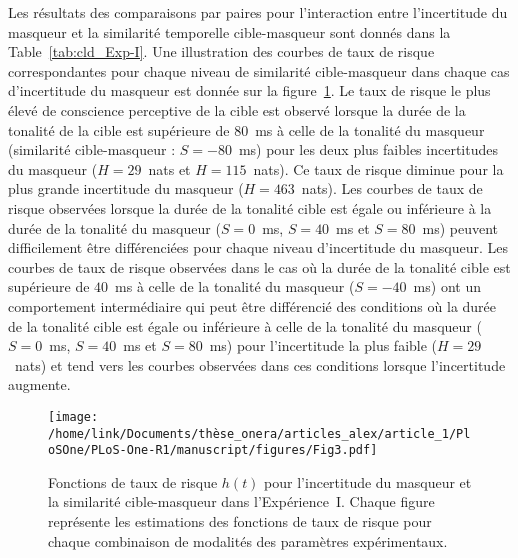 Les résultats des comparaisons par paires pour l'interaction entre l'incertitude du masqueur et la similarité temporelle cible-masqueur sont donnés dans la Table~\ref{tab:cld_Exp-I}. 
Une illustration des courbes de taux de risque correspondantes pour chaque niveau de similarité cible-masqueur dans chaque cas d'incertitude du masqueur est donnée sur la figure~\ref{fig:hr_Exp-I}.
Le taux de risque le plus élevé de conscience perceptive de la cible est observé lorsque la durée de la tonalité de la cible est supérieure de $80$~ms à celle de la tonalité du masqueur (similarité cible-masqueur : $S=-80$~ms) pour les deux plus faibles incertitudes du masqueur ($H=29$~nats et $H=115$~nats). 
Ce taux de risque diminue pour la plus grande incertitude du masqueur ($H=463$~nats). 
Les courbes de taux de risque observées lorsque la durée de la tonalité cible est égale ou inférieure à la durée de la tonalité du masqueur ($S=0$~ms, $S=40$~ms et $S=80$~ms) peuvent difficilement être différenciées pour chaque niveau d'incertitude du masqueur. 
Les courbes de taux de risque observées dans le cas où la durée de la tonalité cible est supérieure de $40$~ms à celle de la tonalité du masqueur ($S=-40$~ms) ont un comportement intermédiaire qui peut être différencié des conditions où la durée de la tonalité cible est égale ou inférieure à celle de la tonalité du masqueur ($S=0$~ms, $S=40$~ms et $S=80$~ms) pour l'incertitude la plus faible ($H=29$~nats) et tend vers les courbes observées dans ces conditions lorsque l'incertitude augmente.  

\begin{figure}[!t]
\texttt{[image: /home/link/Documents/thèse\_onera/articles\_alex/article\_1/PloSOne/PLoS-One-R1/manuscript/figures/Fig3.pdf]}
\caption[Fonctions de taux de risque $h(t)$ pour l'Expérience~I]{Fonctions de taux de risque $h(t)$ pour l'incertitude du masqueur et la similarité cible-masqueur dans l'Expérience~I. 
Chaque figure représente les estimations des fonctions de taux de risque pour chaque combinaison de modalités des paramètres expérimentaux.} 
\label{fig:hr_Exp-I} 
\end{figure}

